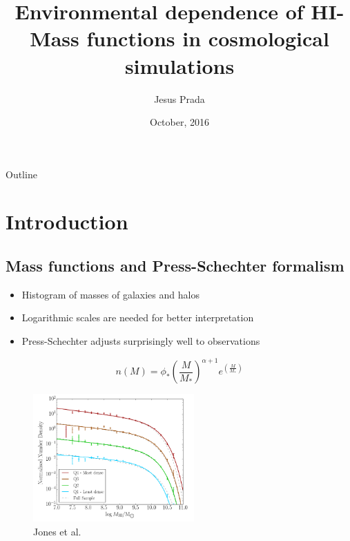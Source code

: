 \documentclass[xcolor=dvipsnames]{beamer}
\title{\textbf{Environmental dependence of HI-Mass functions in cosmological simulations}}
\author{Jesus Prada}
\institute[{\color{Black} Universidad de los Andes}] %
{
Advisor: PhD Jaime Forero-Romero\\
Universidad de los Andes, Physics Department\\
In collaboration with:\\
PhD Michael Jones - Cornell University\\
PhD Martha Haynes - Cornell University \\
}
\date{ \footnotesize October, 2016}
\begin{document}
\begin{frame}
  \titlepage
\end{frame}
\begin{frame}{Outline}
 \tableofcontents
\end{frame}
\section{Introduction}
\subsection{Mass functions and Press-Schechter formalism}
\begin{frame}
\begin{itemize}
\small
\item Histogram of masses of galaxies and halos
\item Logarithmic scales are needed for better interpretation
\item Press-Schechter adjusts surprisingly well to observations
\end{itemize}
$$n(M) = \phi_* \left( \frac{M}{M_*}\right)^{\alpha+1}e^{\left( \frac{M}{M_*}\right)}$$
\normalsize
\begin{figure}[h!]
\centering
\includegraphics[width=0.55\textwidth]{schechterFits}
\centering
{\tiny \\ Jones et al. \cite{jones}}
\end{figure}
\end{frame}
\end{document}
